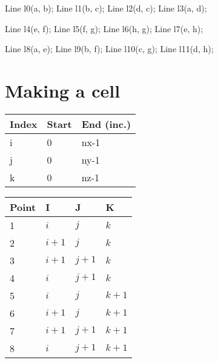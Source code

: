 \documentclass{article}
\begin{document}
\begin{figure}[H]
\centering
{}

\end{figure}

    Line l0(a, b);
    Line l1(b, c);
    Line l2(d, c);
    Line l3(a, d);

    Line l4(e, f);
    Line l5(f, g);
    Line l6(h, g);
    Line l7(e, h);

    Line l8(a, e);
    Line l9(b, f);
    Line l10(c, g);
    Line l11(d, h);

\section{Making a cell}



\begin{center}
\begin{tabular}{lll}
Index & Start & End (inc.)\\
\midrule
i & 0 & nx-1\\
j & 0 & ny-1\\
k & 0 & nz-1
\end{tabular}
\end{center}

\begin{center}
\begin{tabular}{llll}
Point & I & J & K\\
\midrule
1 & $i$ & $j$ & $k$\\
2 & $i+1$ & $j$ & $k$\\
3 & $i+1$ & $j+1$ & $k$\\
4 & $i$ & $j+1$ & $k$\\
5 & $i$ & $j$ & $k+1$\\
6 & $i+1$ & $j$ & $k+1$\\
7 & $i+1$ & $j+1$ & $k+1$\\
8 & $i$ & $j+1$ & $k+1$
\end{tabular}
\end{center}
\end{document}
